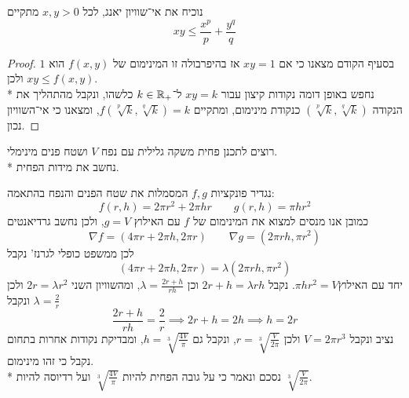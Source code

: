 \Subquestion{}
נוכיח את אי־שוויון יאנג, לכל $x, y > 0$ מתקיים
\[
	xy \le \frac{x^p}{p} + \frac{y^q}{q}
\]
\begin{proof}
	בסעיף הקודם מצאנו כי אם $xy = 1$ אז בהיפרבולה זו המינימום של $f(x, y)$ הוא $1$ ולכן $xy \le f(x, y)$. \\*
	נחפש באופן דומה נקודות קיצון עבור $xy = k$ ל־$k \in \mathbb{R}_+$ כלשהו, ונקבל מהתהליך את הנקודה $(\sqrt[p]{k}, \sqrt[q]{k})$ כנקודת מינימום, ומתקיים $f(\sqrt[p]{k}, \sqrt[q]{k}) = k$, ומצאנו כי אי־השוויון נכון.
\end{proof}

\Question{}
רוצים לתכנן פחית משקה גלילית עם נפח $V$ ושטח פנים מינימלי. \\*
נחשב את מידות הפחית.

נגדיר פונקציות $f, g$ המסמלות את שטח הפנים והנפח בהתאמה:
\[
	f(r, h) = 2\pi r^2 + 2\pi hr
	\qquad
	g(r, h) = \pi hr^2
\]
כמובן אנו מנסים למצוא את המינימום של $f$ עם האילוץ $g = V$, ולכן נחשב גרדיאנטים
\[
	\nabla f = (4\pi r + 2\pi h, 2\pi r)
	\qquad
	\nabla g = (2\pi rh, \pi r^2)
\]
לכן ממשפט כופלי לגרנז' נקבל
\[
	(4\pi r + 2\pi h, 2\pi r) = \lambda (2\pi rh, \pi r^2)
\]
יחד עם האילוץ$\pi h r^2 = V$. נקבל $2r + h = \lambda rh$ וכן $\lambda = \frac{2r + h}{rh}$, ומהשוויון השני $2r = \lambda r^2$ ולכן $\lambda = \frac{2}{r}$ ונקבל
\[
	\frac{2r + h}{rh} = \frac{2}{r} \implies 2r + h = 2h \implies h = 2r
\]
נציב ונקבל $V = 2\pi r^3$ ולכן $r = \sqrt[3]{\frac{V}{2\pi}}$, ונקבל גם $h = \sqrt[3]{\frac{4V}{\pi}}$, ומבדיקת נקודות אחרות בתחום נקבל כי זהו מינימום. \\*
נסכם ונאמר כי על גובה הפחית להיות $\sqrt[3]{\frac{4V}{\pi}}$ ועל רדיוסה להיות $\sqrt[3]{\frac{V}{2\pi}}$.


